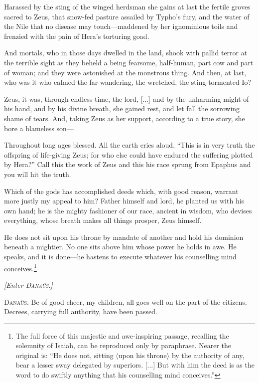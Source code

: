 \documentclass[12pt]{article}
\begin{document}
Harassed by the sting of the winged herdsman she gains at last the fertile groves sacred to Zeus, that snow-fed pasture assailed by Typho's fury, and the water of the Nile that no disease may touch---maddened by her ignominious toils and frenzied with the pain of Hera's torturing goad.

And mortals, who in those days dwelled in the land, shook with pallid terror at the terrible sight as they beheld a being fearsome, half-human, part cow and part of woman; and they were astonished at the monstrous thing. And then, at last, who was it who calmed the far-wandering, the wretched, the sting-tormented Io?

Zeus, it was, through endless time, the lord, [...] and by the unharming might of his hand, and by his divine breath, she gained rest, and let fall the sorrowing shame of tears. And, taking Zeus as her support, according to a true story, she bore a blameless son---

Throughout long ages blessed. All the earth cries aloud, ``This is in very truth the offspring of life-giving Zeus; for who else could have endured the suffering plotted by Hera?'' Call this the work of Zeus and this his race sprung from Epaphus and you will hit the truth.

Which of the gods has accomplished deeds which, with good reason, warrant more justly my appeal to him? Father himself and lord, he planted us with his own hand; he is the mighty fashioner of our race, ancient in wisdom, who devises everything, whose breath makes all things prosper, Zeus himself.

He does not sit upon his throne by mandate of another and hold his dominion beneath a mightier. No one sits above him whose power he holds in awe. He speaks, and it is done---he hastens to execute whatever his counselling mind conceives.\footnote{The full force of this majestic and awe-inspiring passage, recalling the solemnity of Isaiah, can be reproduced only by paraphrase. Nearer the original is: ``He does not, sitting $\langle$upon his throne$\rangle$ by the authority of any, bear a lesser sway delegated by superiors. [...] But with him the deed is as the word to do swiftly anything that his counselling mind conceives.''}

\begin{center}
\textit{[Enter \textsc{Dana\"{u}s.}]}
\end{center}

\textsc{Dana\"{u}s.} Be of good cheer, my children, all goes well on the part of the citizens. Decrees, carrying full authority, have been passed.
\end{document}
